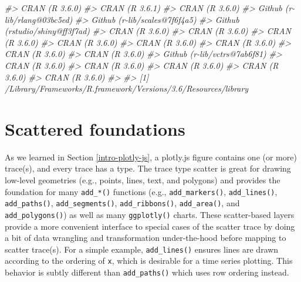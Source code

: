 \documentclass[
  12pt,
]{krantz}
\newenvironment{Shaded}{\begin{snugshade}}{\end{snugshade}}
\newcommand{\CommentTok}[1]{\textcolor[rgb]{0.56,0.35,0.01}{\textit{#1}}}
\begin{document}
\begin{Shaded}
\begin{Highlighting}[]
\CommentTok{#>  CRAN (R 3.6.0)                       }
\CommentTok{#>  CRAN (R 3.6.1)                       }
\CommentTok{#>  CRAN (R 3.6.0)                       }
\CommentTok{#>  Github (r-lib/rlang@03bc5ed)         }
\CommentTok{#>  Github (r-lib/scales@7f6f4a5)        }
\CommentTok{#>  Github (rstudio/shiny@ff3f7ad)       }
\CommentTok{#>  CRAN (R 3.6.0)                       }
\CommentTok{#>  CRAN (R 3.6.0)                       }
\CommentTok{#>  CRAN (R 3.6.0)                       }
\CommentTok{#>  CRAN (R 3.6.0)                       }
\CommentTok{#>  CRAN (R 3.6.0)                       }
\CommentTok{#>  CRAN (R 3.6.0)                       }
\CommentTok{#>  CRAN (R 3.6.0)                       }
\CommentTok{#>  CRAN (R 3.6.0)                       }
\CommentTok{#>  Github (r-lib/vctrs@7ab6f81)         }
\CommentTok{#>  CRAN (R 3.6.0)                       }
\CommentTok{#>  CRAN (R 3.6.0)                       }
\CommentTok{#>  CRAN (R 3.6.0)                       }
\CommentTok{#>  CRAN (R 3.6.0)                       }
\CommentTok{#>  CRAN (R 3.6.0)                       }
\CommentTok{#> }
\CommentTok{#> [1] /Library/Frameworks/R.framework/Versions/3.6/Resources/library}
\end{Highlighting}
\end{Shaded}

\hypertarget{scatter-traces}{%
\chapter{Scattered foundations}\label{scatter-traces}}

As we learned in Section \ref{intro-plotly-js}, a plotly.js figure contains one (or more) trace(s), and every trace has a type. The trace type scatter is great for drawing low-level geometries (e.g., points, lines, text, and polygons) and provides the foundation for many \texttt{add\_*()} functions (e.g., \texttt{add\_markers()}, \texttt{add\_lines()}, \texttt{add\_paths()}, \texttt{add\_segments()}, \texttt{add\_ribbons()}, \texttt{add\_area()}, and \texttt{add\_polygons()}) as well as many \texttt{ggplotly()} charts. These scatter-based layers provide a more convenient interface to special cases of the scatter trace by doing a bit of data wrangling and transformation under-the-hood before mapping to scatter trace(s). For a simple example, \texttt{add\_lines()} ensures lines are drawn according to the ordering of \texttt{x}, which is desirable for a time series plotting. This behavior is subtly different than \texttt{add\_paths()} which uses row ordering instead.
\end{document}
